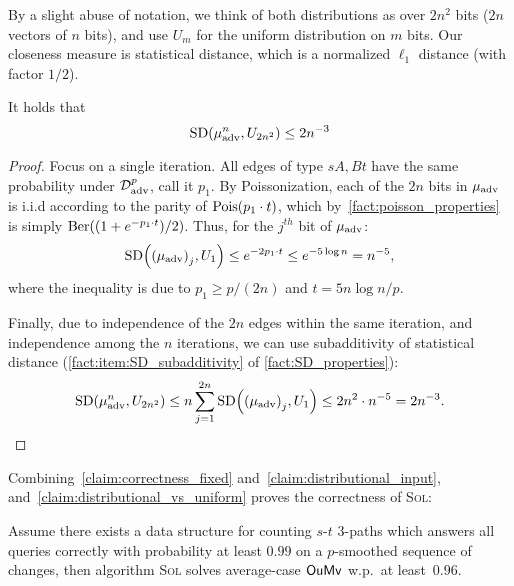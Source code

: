 \documentclass[letter,11pt]{article}
\newcommand{\oumv}{\textnormal{\textsf{OuMv}}\xspace}
\newcommand{\paths}[3]{${#1}$-${#2}$ ${#3}$-paths\xspace}
\newcommand{\sol}{\textsc{Sol}\xspace}
\newcommand{\advdist}{\mathcal{D}_\textnormal{adv}}
\newcommand{\muadv}{\mu_\textnormal{adv}}
\begin{document}
By a slight abuse of notation, we think of both distributions as over $2n^2$ bits ($2n$ vectors of $n$ bits), and use $U_m$ for the uniform distribution on $m$ bits.
Our closeness measure is statistical distance, which is a normalized $\ell_1$ distance (with factor $1/2$).
\begin{claim}
    \label{claim:distributional_vs_uniform}
    It holds that
    \[
        \sd{\muadv^n}{U_{2n^2}}  \leq 2n^{-3}
    \]
\end{claim}
\begin{proof}
    Focus on a single iteration.
    All edges of type $sA, Bt$ have the same probability under $\advdist^p$, call it $p_1$.
    By Poissonization, each of the $2n$ bits in $\muadv$ is i.i.d according to the parity of $\poisson{p_1 \cdot t}$, which by~\cref{fact:poisson_properties} is simply $\bernoulli{(1+e^{-p_1\cdot t})/2}$.
    Thus, for the $j^{th}$ bit of $\muadv$:
    \[
        \sd{\left(\muadv\right)_j}{U_1}
        \leq e^{-2 p_1 \cdot t}
        \leq e^{-5 \log n}
        = n^{-5},
    \]
    where the inequality is due to $p_1 \geq p/(2n)$ and $t = 5n\log n / p$.

    Finally, due to independence of the $2n$ edges within the same iteration, and independence among the $n$ iterations, we can use subadditivity of statistical distance (\cref{fact:item:SD_subadditivity} of \cref{fact:SD_properties}):
    \[
        \sd{\muadv^n}{U_{2n^2}}
        \leq n \sum_{j=1}^{2n} \sd{\left(\muadv\right)_j}{U_1}
        \leq 2n^2\cdot n^{-5} 
        = 2n^{-3} .\qedhere
    \]
\end{proof}

Combining~\cref{claim:correctness_fixed} and~\cref{claim:distributional_input}, and~\cref{claim:distributional_vs_uniform} proves the correctness of \sol:

\begin{claim}[Correctness]
    \label{claim:correctness_final}
    Assume there exists a data structure for counting \paths{s}{t}{3} which answers all queries correctly with probability at least $0.99$ on a $p$-smoothed sequence of changes,
    then algorithm \sol solves average-case $\oumv$ w.p.\ at least~$0.96$.
\end{claim}
\end{document}
